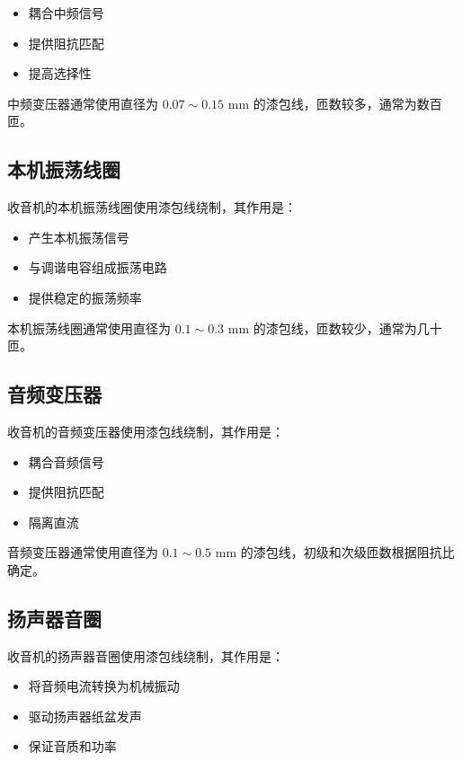 \documentclass[12pt,UTF8]{ctexbook}
\begin{document}
\begin{itemize}[leftmargin=2cm]
    \item 耦合中频信号
    \item 提供阻抗匹配
    \item 提高选择性
\end{itemize}

中频变压器通常使用直径为 $0.07 \sim 0.15$ mm 的漆包线，匝数较多，通常为数百匝。

\subsection{本机振荡线圈}

收音机的本机振荡线圈使用漆包线绕制，其作用是：

\begin{itemize}[leftmargin=2cm]
    \item 产生本机振荡信号
    \item 与调谐电容组成振荡电路
    \item 提供稳定的振荡频率
\end{itemize}

本机振荡线圈通常使用直径为 $0.1 \sim 0.3$ mm 的漆包线，匝数较少，通常为几十匝。

\subsection{音频变压器}

收音机的音频变压器使用漆包线绕制，其作用是：

\begin{itemize}[leftmargin=2cm]
    \item 耦合音频信号
    \item 提供阻抗匹配
    \item 隔离直流
\end{itemize}

音频变压器通常使用直径为 $0.1 \sim 0.5$ mm 的漆包线，初级和次级匝数根据阻抗比确定。

\subsection{扬声器音圈}

收音机的扬声器音圈使用漆包线绕制，其作用是：

\begin{itemize}[leftmargin=2cm]
    \item 将音频电流转换为机械振动
    \item 驱动扬声器纸盆发声
    \item 保证音质和功率
\end{itemize}
\end{document}
